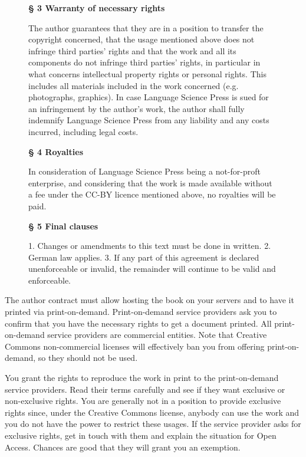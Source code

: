 \documentclass[nonflat,modfonts,output=book] {langsci/langscibook}
\begin{document}
\begin{figure}
{{{\medskip\noindent
\textbf{§ 3 Warranty of necessary rights}

The author guarantees that they are in a position to transfer the copyright concerned, that the usage mentioned above does not infringe third parties' rights and that the work and all its components do not infringe third parties' rights, in particular in what concerns intellectual property rights or personal rights. This includes all materials included in the work concerned (e.g. photographs, graphics). In case Language Science Press is sued for an infringement by the author's work, the author shall fully indemnify Language Science Press from any liability and any costs incurred, including legal costs. 

\medskip\noindent
\textbf{§ 4 Royalties}

In consideration of Language Science Press being a not-for-proft enterprise, and considering that the work is made available without a fee under the CC-BY licence mentioned above, no royalties will be paid. 

\medskip\noindent
\textbf{§ 5 Final clauses}

1. Changes or amendments to this text must be done in written.
2. German law applies.
3. If any part of this agreement is declared unenforceable or invalid, the remainder will continue to be valid and enforceable.
 }
}}
\end{figure}


The author contract must allow hosting the book on your servers and to have it printed via  print-on-demand.
Print-on-demand service providers ask you to confirm that you have the necessary rights to get a document printed. 
All print-on-demand service providers are commercial entities. Note that Creative Commons non-commercial licenses will effectively ban you from offering print-on-demand, so they should not be used. 

You grant the rights to reproduce the work in print to the print-on-demand service providers. Read their terms carefully and see if they want exclusive or non-exclusive rights. You are generally not in a position to provide exclusive rights since, under the Creative Commons license, anybody can use the work and you do not have the power to restrict these usages. If the service provider asks for exclusive rights, get in touch with them and explain the situation for Open Access. Chances are good that they will grant you an exemption. 
\end{document}
